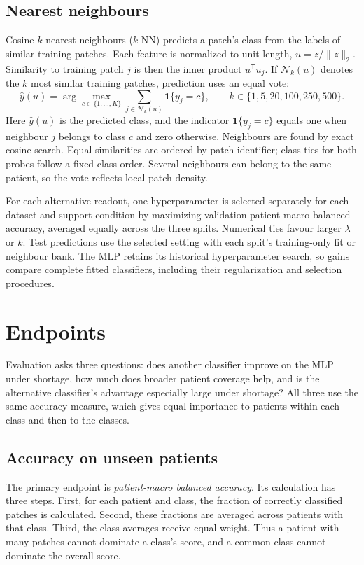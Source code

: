 \documentclass[11pt]{article}
\begin{document}
\subsection{Nearest neighbours}
Cosine \(k\)-nearest neighbours (\(k\)-NN) predicts a patch's class from the labels of similar training patches. Each feature is normalized to unit length, \(u=z/\lVert z\rVert_2\). Similarity to training patch \(j\) is then the inner product \(u^{\mathsf T}u_j\). If \(\mathcal{N}_k(u)\) denotes the \(k\) most similar training patches, prediction uses an equal vote:
\begin{equation}
\widehat y(u)=\arg\max_{c\in\{1,\ldots,K\}}
\sum_{j\in\mathcal{N}_k(u)}\mathbf{1}\{y_j=c\},
\qquad k\in\{1,5,20,100,250,500\}.
\label{eq:knn}
\end{equation}
\noindent Here \(\widehat y(u)\) is the predicted class, and the indicator \(\mathbf{1}\{y_j=c\}\) equals one when neighbour \(j\) belongs to class \(c\) and zero otherwise. Neighbours are found by exact cosine search. Equal similarities are ordered by patch identifier; class ties for both probes follow a fixed class order. Several neighbours can belong to the same patient, so the vote reflects local patch density.

For each alternative readout, one hyperparameter is selected separately for each dataset and support condition by maximizing validation patient-macro balanced accuracy, averaged equally across the three splits. Numerical ties favour larger \(\lambda\) or \(k\). Test predictions use the selected setting with each split's training-only fit or neighbour bank. The MLP retains its historical hyperparameter search, so gains compare complete fitted classifiers, including their regularization and selection procedures.
\section{Endpoints}
\label{sec:analysis}
Evaluation asks three questions: does another classifier improve on the MLP under shortage, how much does broader patient coverage help, and is the alternative classifier's advantage especially large under shortage? All three use the same accuracy measure, which gives equal importance to patients within each class and then to the classes.

\subsection{Accuracy on unseen patients}
The primary endpoint is \emph{patient-macro balanced accuracy}. Its calculation has three steps. First, for each patient and class, the fraction of correctly classified patches is calculated. Second, these fractions are averaged across patients with that class. Third, the class averages receive equal weight. Thus a patient with many patches cannot dominate a class's score, and a common class cannot dominate the overall score.
\end{document}

